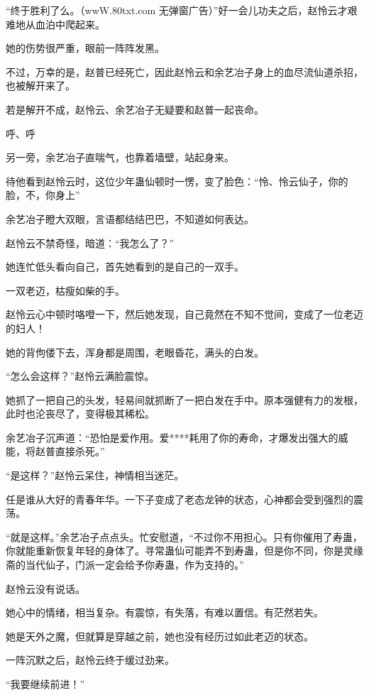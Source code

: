 
\begin{this_body}

“终于胜利了么。（wwW.80txt.com 无弹窗广告）”好一会儿功夫之后，赵怜云才艰难地从血泊中爬起来。

她的伤势很严重，眼前一阵阵发黑。

不过，万幸的是，赵普已经死亡，因此赵怜云和余艺冶子身上的血尽流仙道杀招，也被解开来了。

若是解开不成，赵怜云、余艺冶子无疑要和赵普一起丧命。

呼、呼

另一旁，余艺冶子直喘气，也靠着墙壁，站起身来。

待他看到赵怜云时，这位少年蛊仙顿时一愣，变了脸色：“怜、怜云仙子，你的脸，不，你身上”

余艺冶子瞪大双眼，言语都结结巴巴，不知道如何表达。

赵怜云不禁奇怪，暗道：“我怎么了？”

她连忙低头看向自己，首先她看到的是自己的一双手。

一双老迈，枯瘦如柴的手。

赵怜云心中顿时咯噔一下，然后她发现，自己竟然在不知不觉间，变成了一位老迈的妇人！

她的背佝偻下去，浑身都是周围，老眼昏花，满头的白发。

“怎么会这样？”赵怜云满脸震惊。

她抓了一把自己的头发，轻易间就抓断了一把白发在手中。原本强健有力的发根，此时也沦丧尽了，变得极其稀松。

余艺冶子沉声道：“恐怕是爱作用。爱****耗用了你的寿命，才爆发出强大的威能，将赵普直接杀死。”

“是这样？”赵怜云呆住，神情相当迷茫。

任是谁从大好的青春年华。一下子变成了老态龙钟的状态，心神都会受到强烈的震荡。

“就是这样。”余艺冶子点点头。忙安慰道，“不过你不用担心。只有你催用了寿蛊，你就能重新恢复年轻的身体了。寻常蛊仙可能弄不到寿蛊，但是你不同，你是灵缘斋的当代仙子，门派一定会给予你寿蛊，作为支持的。”

赵怜云没有说话。

她心中的情绪，相当复杂。有震惊，有失落，有难以置信。有茫然若失。

她是天外之魔，但就算是穿越之前，她也没有经历过如此老迈的状态。

一阵沉默之后，赵怜云终于缓过劲来。

“我要继续前进！”


\end{this_body}
